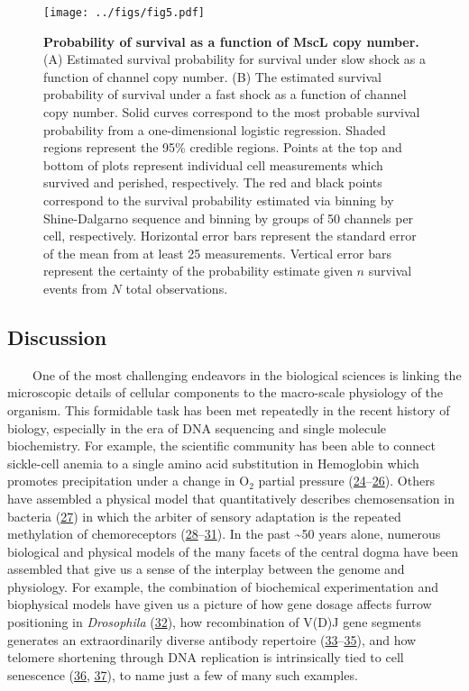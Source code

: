\begin{figure}
\centering
\texttt{[image: ../figs/fig5.pdf]}
\caption{\textbf{Probability
of
survival
as a
function
of
MscL
copy
number.}
(A)
Estimated
survival
probability
for
survival
under
slow
shock
as a
function
of
channel
copy
number.
(B)
The
estimated
survival
probability
of
survival
under
a fast
shock
as a
function
of
channel
copy
number.
Solid
curves
correspond
to the
most
probable
survival
probability
from a
one-dimensional
logistic
regression.
Shaded
regions
represent
the
95\%
credible
regions.
Points
at the
top
and
bottom
of
plots
represent
individual
cell
measurements
which
survived
and
perished,
respectively.
The
red
and
black
points
correspond
to the
survival
probability
estimated
via
binning
by
Shine-Dalgarno
sequence
and
binning
by
groups
of 50
channels
per
cell,
respectively.
Horizontal
error
bars
represent
the
standard
error
of the
mean
from
at
least
25
measurements.
Vertical
error
bars
represent
the
certainty
of the
probability
estimate
given
\(n\)
survival
events
from
\(N\)
total
observations.}\label{fig:survival}
\end{figure}

\subsection{Discussion}\label{discussion}

~~~~One
of the
most
challenging
endeavors
in the
biological
sciences
is
linking
the
microscopic
details
of
cellular
components
to the
macro-scale
physiology
of the
organism.
This
formidable
task
has
been
met
repeatedly
in the
recent
history
of
biology,
especially
in the
era of
DNA
sequencing
and
single
molecule
biochemistry.
For
example,
the
scientific
community
has
been
able
to
connect
sickle-cell
anemia
to a
single
amino
acid
substitution
in
Hemoglobin
which
promotes
precipitation
under
a
change
in
O\(_2\)
partial
pressure
(\protect\hyperlink{ref-feeling-taylor2004}{24}--\protect\hyperlink{ref-perutz1950}{26}).
Others
have
assembled
a
physical
model
that
quantitatively
describes
chemosensation
in
bacteria
(\protect\hyperlink{ref-berg1977}{27})
in
which
the
arbiter
of
sensory
adaptation
is the
repeated
methylation
of
chemoreceptors
(\protect\hyperlink{ref-colin2017}{28}--\protect\hyperlink{ref-sourjik2002}{31}).
In the
past
\textasciitilde{}50
years
alone,
numerous
biological
and
physical
models
of the
many
facets
of the
central
dogma
have
been
assembled
that
give
us a
sense
of the
interplay
between
the
genome
and
physiology.
For
example,
the
combination
of
biochemical
experimentation
and
biophysical
models
have
given
us a
picture
of how
gene
dosage
affects
furrow
positioning
in
\emph{Drosophila}
(\protect\hyperlink{ref-liu2013}{32}),
how
recombination
of
V(D)J
gene
segments
generates
an
extraordinarily
diverse
antibody
repertoire
(\protect\hyperlink{ref-lovely2015}{33}--\protect\hyperlink{ref-schatz2011}{35}),
and
how
telomere
shortening
through
DNA
replication
is
intrinsically
tied
to
cell
senescence
(\protect\hyperlink{ref-herbig2004}{36},
\protect\hyperlink{ref-victorelli2017}{37}),
to
name
just a
few of
many
such
examples.

